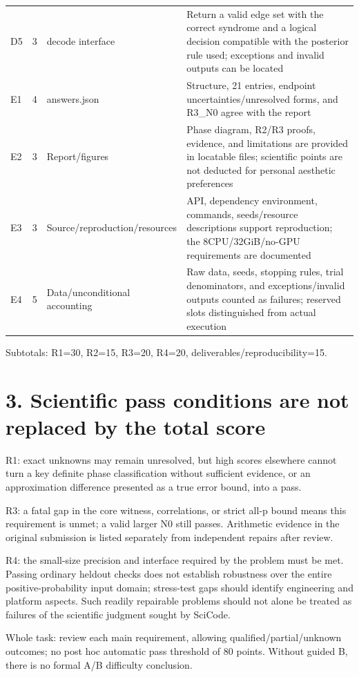 \documentclass[11pt,a4paper]{article}
\begin{document}
{\begin{longtable}
{}D5 & 3 & decode interface & Return a valid edge set with the correct syndrome and a logical decision compatible with the posterior rule used; exceptions and invalid outputs can be located\tabularnewline
{}E1 & 4 & answers.json & Structure, 21 entries, endpoint uncertainties/\allowbreak{}unresolved forms, and R3\_N0 agree with the report\tabularnewline
{}E2 & 3 & Report/\allowbreak{}figures & Phase diagram, R2/\allowbreak{}R3 proofs, evidence, and limitations are provided in locatable files; scientific points are not deducted for personal aesthetic preferences\tabularnewline
{}E3 & 3 & Source/\allowbreak{}reproduction/\allowbreak{}resources & API, dependency environment, commands, seeds/\allowbreak{}resource descriptions support reproduction; the 8CPU/\allowbreak{}32GiB/\allowbreak{}no-GPU requirements are documented\tabularnewline
{}E4 & 5 & Data/\allowbreak{}unconditional accounting & Raw data, seeds, stopping rules, trial denominators, and exceptions/\allowbreak{}invalid outputs counted as failures; reserved slots distinguished from actual execution\tabularnewline
\bottomrule
\end{longtable}
}

Subtotals: R1=30, R2=15, R3=20, R4=20, deliverables/\allowbreak{}reproducibility=15.

\section*{3. Scientific pass conditions are not replaced by the total score}

R1: exact unknowns may remain unresolved, but high scores elsewhere cannot turn a key definite phase classification without sufficient evidence, or an approximation difference presented as a true error bound, into a pass.

R3: a fatal gap in the core witness, correlations, or strict all-p bound means this requirement is unmet; a valid larger N0 still passes. Arithmetic evidence in the original submission is listed separately from independent repairs after review.

R4: the small-size precision and interface required by the problem must be met. Passing ordinary heldout checks does not establish robustness over the entire positive-probability input domain; stress-test gaps should identify engineering and platform aspects. Such readily repairable problems should not alone be treated as failures of the scientific judgment sought by SciCode.

Whole task: review each main requirement, allowing qualified/\allowbreak{}partial/\allowbreak{}unknown outcomes; no post hoc automatic pass threshold of 80 points. Without guided B, there is no formal A/\allowbreak{}B difficulty conclusion.
\end{document}
